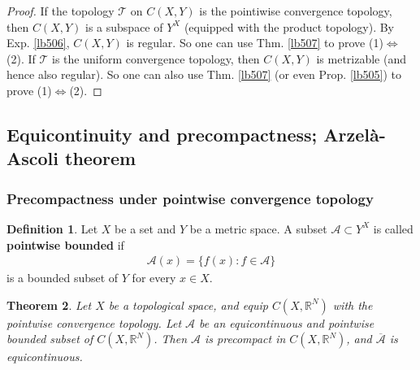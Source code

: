 \documentclass[12pt,b5paper,notitlepage]{article}
\theoremstyle{definition}
\newtheorem{df}{Definition}[section]
\theoremstyle{plain}
\newtheorem{thm}[df]{Theorem}
\newcommand{\mc}{\mathcal}
\newcommand{\ovl}{\overline}
\newcommand{\scr}{\mathscr}
\newcommand{\Rbb}{\mathbb R}
\numberwithin{equation}{section}
\begin{document}
\begin{proof}
If the topology $\mc T$ on $C(X,Y)$ is the pointiwise convergence topology, then $C(X,Y)$ is a subspace of $Y^X$ (equipped with the product topology). By Exp. \ref{lb506}, $C(X,Y)$ is regular. So one can use Thm. \ref{lb507} to prove (1)$\Leftrightarrow$(2). If $\mc T$ is the uniform convergence topology, then $C(X,Y)$ is metrizable (and hence also regular). So one can also use Thm. \ref{lb507} (or even Prop. \ref{lb505}) to prove (1)$\Leftrightarrow$(2). 
\end{proof}




\subsection{Equicontinuity and precompactness; Arzel\`a-Ascoli theorem}\label{lb517}


\subsubsection{Precompactness under pointwise convergence topology}


\begin{df}
Let $X$ be a set and $Y$ be a metric space. A subset $\scr A\subset Y^X$ is called \textbf{pointwise bounded}  if
\begin{align}
\scr A(x)=\{f(x):f\in\scr A\}
\end{align}
is a bounded subset of $Y$ for every $x\in X$.
\end{df}





\begin{thm}\label{lb509}
Let $X$ be a topological space, and equip $C(X,\Rbb^N)$ with the pointwise convergence topology. Let $\scr A$ be an equicontinuous and pointwise bounded subset of $C(X,\Rbb^N)$. Then $\scr A$ is precompact in $C(X,\Rbb^N)$, and $\ovl{\scr A}$ is equicontinuous. 
\end{thm}
\end{document}
